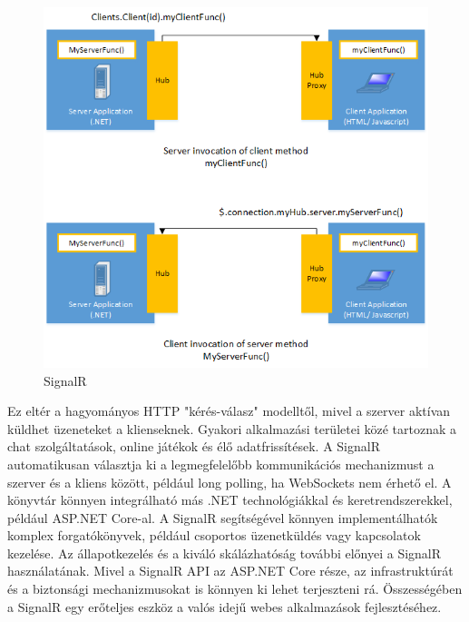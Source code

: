 \begin{figure}[H]
    \centering
    \includegraphics[width=9.0truecm]{images/SignalR.png}
    \caption[SignalR]{SignalR \cite{signalR}}
    \label{fig:signalR}
\end{figure}

Ez eltér a hagyományos HTTP "kérés-válasz" modelltől,
mivel a szerver aktívan küldhet üzeneteket a klienseknek.
Gyakori alkalmazási területei közé tartoznak a chat szolgáltatások,
online játékok és élő adatfrissítések. A SignalR automatikusan választja ki a legmegfelelőbb kommunikációs mechanizmust a szerver és a kliens között,
például long polling, ha WebSockets nem érhető el. A könyvtár könnyen integrálható más .NET technológiákkal és keretrendszerekkel, például ASP.NET Core-al.
A SignalR segítségével könnyen implementálhatók komplex forgatókönyvek, például csoportos üzenetküldés vagy kapcsolatok kezelése. Az állapotkezelés és a kiváló skálázhatóság további előnyei a SignalR használatának.
Mivel a SignalR API az ASP.NET Core része, az infrastruktúrát és a biztonsági mechanizmusokat is könnyen ki lehet terjeszteni rá. Összességében a SignalR egy erőteljes eszköz a valós idejű webes alkalmazások fejlesztéséhez.
